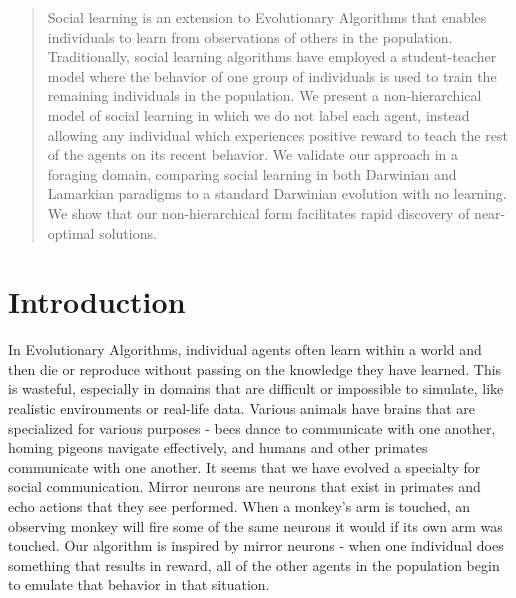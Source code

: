 \documentclass{acm_proc_article-sp}
\begin{document}
\maketitle
\begin{abstract}
Social learning is an extension to Evolutionary Algorithms that enables individuals to learn from observations of others in the population.
 Traditionally, social learning algorithms have employed a student-teacher model where the behavior of one group of individuals is used to train the remaining individuals in the population.  
 We present a non-hierarchical model of social learning in which we do not label each agent, instead allowing any individual which experiences positive reward to teach the rest of the agents on its recent behavior. 
 We validate our approach in a foraging domain, comparing social learning in both Darwinian and Lamarkian paradigms to a standard Darwinian evolution with no learning. 
 We show that our non-hierarchical form facilitates rapid discovery of near-optimal solutions.
\end{abstract}



\section{Introduction} 
	In Evolutionary Algorithms, individual agents often learn within a world and then die or reproduce without passing on the knowledge they have learned.  This is wasteful, especially in domains that are difficult or impossible to simulate, like realistic environments or real-life data.
	Various animals have brains that are specialized for various purposes - bees dance to communicate with one another, homing pigeons navigate effectively, and humans and other primates communicate with one another.  It seems that we have evolved a specialty for social communication. 
	Mirror neurons are neurons that exist in primates and echo actions that they see performed.  When a monkey's arm is touched, an observing monkey will fire some of the same neurons it would if its own arm was touched. \cite{gallese-98}  Our algorithm is inspired by mirror neurons - when one individual does something that results in reward, all of the other agents in the population begin to emulate that behavior in that situation.
    
\end{document}
